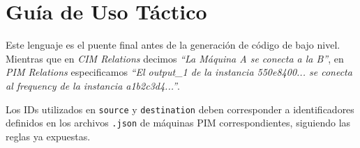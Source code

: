 \section{Guía de Uso Táctico}

Este lenguaje es el puente final antes de la generación de código de bajo nivel. Mientras que en \textit{CIM Relations} decimos \textit{``La Máquina A se conecta a la B''}, en \textit{PIM Relations} especificamos \textit{``El output\_1 de la instancia 550e8400... se conecta al frequency de la instancia a1b2c3d4...''}.

\begin{tcolorbox}[colback=red!5!white,colframe=red!75!black,title=IMPORTANTE]
Los IDs utilizados en \texttt{source} y \texttt{destination} deben corresponder a identificadores definidos en los archivos \texttt{.json} de máquinas PIM correspondientes, siguiendo las reglas ya expuestas.
\end{tcolorbox}
